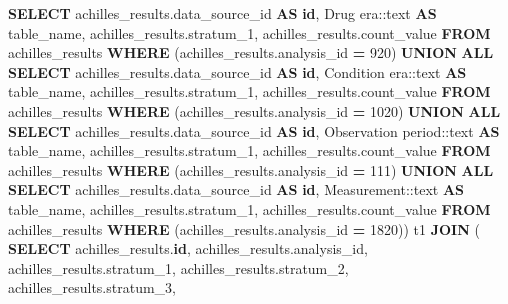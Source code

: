 \documentclass[
]{book}
\newenvironment{Shaded}{\begin{snugshade}}{\end{snugshade}}
\newcommand{\CharTok}[1]{\textcolor[rgb]{0.31,0.60,0.02}{#1}}
\newcommand{\DecValTok}[1]{\textcolor[rgb]{0.00,0.00,0.81}{#1}}
\newcommand{\KeywordTok}[1]{\textcolor[rgb]{0.13,0.29,0.53}{\textbf{#1}}}
\newcommand{\NormalTok}[1]{#1}
\newcommand{\OperatorTok}[1]{\textcolor[rgb]{0.81,0.36,0.00}{\textbf{#1}}}
\newcommand{\StringTok}[1]{\textcolor[rgb]{0.31,0.60,0.02}{#1}}
\begin{document}
\begin{Shaded}
\begin{Highlighting}[]
        \KeywordTok{SELECT}\NormalTok{ achilles\_results.data\_source\_id }\KeywordTok{AS} \KeywordTok{id}\NormalTok{,}
           \StringTok{\textquotesingle{}Drug era\textquotesingle{}}\NormalTok{:}\CharTok{:text} \KeywordTok{AS}\NormalTok{ table\_name,}
\NormalTok{           achilles\_results.stratum\_1,}
\NormalTok{           achilles\_results.count\_value}
          \KeywordTok{FROM}\NormalTok{ achilles\_results}
         \KeywordTok{WHERE}\NormalTok{ (achilles\_results.analysis\_id }\OperatorTok{=} \DecValTok{920}\NormalTok{)}
       \KeywordTok{UNION} \KeywordTok{ALL}
        \KeywordTok{SELECT}\NormalTok{ achilles\_results.data\_source\_id }\KeywordTok{AS} \KeywordTok{id}\NormalTok{,}
           \StringTok{\textquotesingle{}Condition era\textquotesingle{}}\NormalTok{:}\CharTok{:text} \KeywordTok{AS}\NormalTok{ table\_name,}
\NormalTok{           achilles\_results.stratum\_1,}
\NormalTok{           achilles\_results.count\_value}
          \KeywordTok{FROM}\NormalTok{ achilles\_results}
         \KeywordTok{WHERE}\NormalTok{ (achilles\_results.analysis\_id }\OperatorTok{=} \DecValTok{1020}\NormalTok{)}
       \KeywordTok{UNION} \KeywordTok{ALL}
        \KeywordTok{SELECT}\NormalTok{ achilles\_results.data\_source\_id }\KeywordTok{AS} \KeywordTok{id}\NormalTok{,}
           \StringTok{\textquotesingle{}Observation period\textquotesingle{}}\NormalTok{:}\CharTok{:text} \KeywordTok{AS}\NormalTok{ table\_name,}
\NormalTok{           achilles\_results.stratum\_1,}
\NormalTok{           achilles\_results.count\_value}
          \KeywordTok{FROM}\NormalTok{ achilles\_results}
         \KeywordTok{WHERE}\NormalTok{ (achilles\_results.analysis\_id }\OperatorTok{=} \DecValTok{111}\NormalTok{)}
       \KeywordTok{UNION} \KeywordTok{ALL}
        \KeywordTok{SELECT}\NormalTok{ achilles\_results.data\_source\_id }\KeywordTok{AS} \KeywordTok{id}\NormalTok{,}
           \StringTok{\textquotesingle{}Measurement\textquotesingle{}}\NormalTok{:}\CharTok{:text} \KeywordTok{AS}\NormalTok{ table\_name,}
\NormalTok{           achilles\_results.stratum\_1,}
\NormalTok{           achilles\_results.count\_value}
          \KeywordTok{FROM}\NormalTok{ achilles\_results}
         \KeywordTok{WHERE}\NormalTok{ (achilles\_results.analysis\_id }\OperatorTok{=} \DecValTok{1820}\NormalTok{)) t1}
    \KeywordTok{JOIN}\NormalTok{ ( }\KeywordTok{SELECT}\NormalTok{ achilles\_results.}\KeywordTok{id}\NormalTok{,}
\NormalTok{           achilles\_results.analysis\_id,}
\NormalTok{           achilles\_results.stratum\_1,}
\NormalTok{           achilles\_results.stratum\_2,}
\NormalTok{           achilles\_results.stratum\_3,}

\end{Highlighting}
\end{Shaded}
\end{document}
